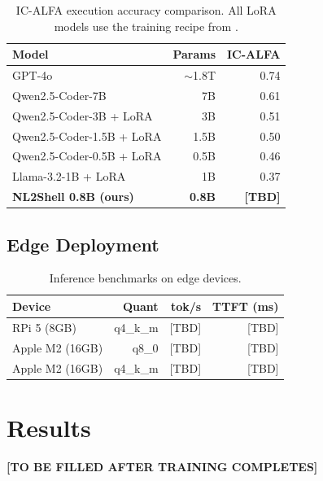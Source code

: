 \documentclass[11pt,a4paper]{article}
\begin{document}
\begin{table}[t]
\centering
\small
\begin{tabular}{lrr}
\toprule
\textbf{Model} & \textbf{Params} & \textbf{IC-ALFA} \\
\midrule
GPT-4o & $\sim$1.8T & 0.74 \\
Qwen2.5-Coder-7B & 7B & 0.61 \\
Qwen2.5-Coder-3B + LoRA & 3B & 0.51 \\
Qwen2.5-Coder-1.5B + LoRA & 1.5B & 0.50 \\
Qwen2.5-Coder-0.5B + LoRA & 0.5B & 0.46 \\
Llama-3.2-1B + LoRA & 1B & 0.37 \\
\midrule
\textbf{NL2Shell 0.8B (ours)} & \textbf{0.8B} & \textbf{[TBD]} \\
\bottomrule
\end{tabular}
\caption{IC-ALFA execution accuracy comparison. All LoRA models use the training recipe from \citet{westenfelder2025}.}
\label{tab:results}
\end{table}

\subsection{Edge Deployment}

\begin{table}[t]
\centering
\small
\begin{tabular}{lrrr}
\toprule
\textbf{Device} & \textbf{Quant} & \textbf{tok/s} & \textbf{TTFT (ms)} \\
\midrule
RPi 5 (8GB) & q4\_k\_m & [TBD] & [TBD] \\
Apple M2 (16GB) & q8\_0 & [TBD] & [TBD] \\
Apple M2 (16GB) & q4\_k\_m & [TBD] & [TBD] \\
\bottomrule
\end{tabular}
\caption{Inference benchmarks on edge devices.}
\label{tab:edge}
\end{table}

\section{Results}

\textbf{[TO BE FILLED AFTER TRAINING COMPLETES]}

\end{document}

